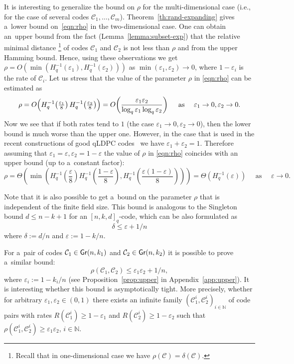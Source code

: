 \documentclass[11pt]{article}
\newcommand{\rbr}[1]{\left(#1\right)}
\let\le\leqslant
\let\ge\geqslant
\newcommand{\eps}{\varepsilon}
\theoremstyle{plain}
\theoremstyle{definition}
\theoremstyle{remark}
\newcommand{\NN}{\mathbb{N}}
\newcommand{\cC}{\mathcal{C}}
\newcommand{\Gr}{{\sf Gr}}
\begin{document}
It is interesting to generalize the bound on $\rho$ for the multi-dimensional case (i.e., for the case of several codes $\cC_1,\dots,\cC_m$). Theorem~\ref{th:rand-expanding} gives a~lower bound on~\eqref{eqn:rho} in the two-dimensional case. One can obtain an~upper bound from the fact (Lemma~\ref{lemma:subset-exp}) that the relative minimal distance%
\footnote{Recall that in one-dimensional case we have $\rho(\cC) = \delta(\cC)$.}
of codes $\cC_1$ and $\cC_2$ is not less than $\rho$ and from the upper Hamming bound. Hence, using these observations we get $\rho=O(\min(H_q^{-1}(\eps_1),H_q^{-1}(\eps_2)))$ as $\min(\eps_1,\eps_2)\to 0$, where $1-\eps_i$ is the rate of $\cC_i$. Let us stress that the value of the parameter $\rho$ in \eqref{eqn:rho} can be estimated as
\[
\rho = O\Bigl(H_q^{-1}\!\rbr{\textstyle\frac{\eps_1}{8}}H_q^{-1}\!\rbr{\textstyle\frac{\eps_2}{8}}\Bigr)=O\!\rbr{\frac{\eps_1\eps_2}{\log_q \eps_1\log_q \eps_2}}\quad\mbox{ as }\quad \eps_1\to 0, \eps_2\to 0. 
\]
Now we see that if both rates tend to  $1$ (the case $\eps_1\to 0, \eps_2\to 0$), then the lower bound is much worse than the upper one. However, in the case that is used in the recent constructions of good qLDPC codes~\cite{Panteleev&Kalachev:stoc2022,Leverrier:focs2022} we have $\eps_1+\eps_2=1$. Therefore assuming that $\eps_1=\eps, \eps_2=1-\eps$ the value of $\rho$ in \eqref{eqn:rho} coincides with an upper bound (up to a~constant factor): 
\[
\rho=\Theta\rbr{\min\rbr{H_q^{-1}\!\rbr{\textstyle\frac{\eps}{8}}H_q^{-1}\!\rbr{\textstyle\frac{1-\eps}{8}},H_q^{-1}\!\rbr{\textstyle\frac{\eps(1-\eps)}{8}}}}=\Theta\!\rbr{H_q^{-1}(\eps)}\quad\mbox{ as }\quad \eps\to 0. 
\]

Note that it is also possible to get a~bound on the parameter $\rho$ that is independent of the finite field size. This bound is analogous to the Singleton bound $d\le n-k + 1$ for an $[n,k,d]_q$-code, which can be also formulated as 
\[\delta \le \eps + 1/n\]
where $\delta := d/n$ and $\eps := 1 - k/n$.

For a~pair of codes $\cC_1\in\Gr(n,k_1)$ and $\cC_2\in\Gr(n,k_2)$ it is possible to prove a~similar bound:
\[
\rho(\cC_1,\cC_2)\le\eps_1\eps_2+1/n,
\]
where $\eps_i:=1-k_i/n$ (see Proposition~\ref{prop:upper} in Appendix~\ref{app:upper}).
It is interesting whether this bound is asymptotically tight. More precisely, whether for arbitrary $\eps_1,\eps_2\in (0,1)$ there exists an infinite family  $(\cC_1^i,\cC_2^i)_{i\in\NN}$ of code pairs with rates  $R(\cC_1^i) \ge 1-\eps_1$ and  $R(\cC_2^i) \ge 1-\eps_2$ such that $\rho(\cC_1^i,\cC_2^i)\ge \eps_1\eps_2$, $i\in\NN$. 
\end{document}
